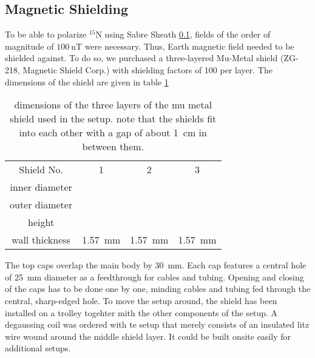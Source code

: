         \subsection{Magnetic Shielding}
        To be able to polarize $^{15}\mathrm{N}$ using Sabre Sheath \ref{}, fields of the order of
            magnitude of $\SI{100}{\nano\tesla}$ were necessary. Thus, Earth magnetic field needed to
            be shielded against. To do so, we purchased a three-layered Mu-Metal shield (ZG-218, Magnetic
            Shield Corp.) with shielding factors of 100 per layer. The dimensions of the shield are given in table \ref{table:matMeth:muMetalDims}
            \begin{table}
                \centering
                \begin{tabular}{cccc}
                    Shield No. & 1 & 2 & 3 \\
                    inner diameter & & & \\
                    outer diameter & & & \\
                    height & & &\\
                    wall thickness &\SI{1.57}{\mm}&\SI{1.57}{\mm}&\SI{1.57}{\mm} 
                \end{tabular}
                \caption[shield dimensions]{dimensions of the three layers of the mu metal shield used in the setup. note that the shields  fit into each other with a gap of about \SI{1}{\cm} in between them.}
                \label{table:matMeth:muMetalDims}
            \end{table}
            The top caps overlap the main body by \SI{30}{\mm}.  Each cap features a central hole of \SI{25}{\mm} diameter as a feedthrough for cables and tubing. Opening and closing of the caps has to be done one by one, minding cables and tubing fed through the central, sharp-edged hole. To move the setup around, the shield has been installed on a trolley togehter mith the other components of the setup.  A degaussing coil was ordered with te setup that merely consists of an insulated litz wire wound around the middle shield layer.  It could be built onsite easily for additional setups.
